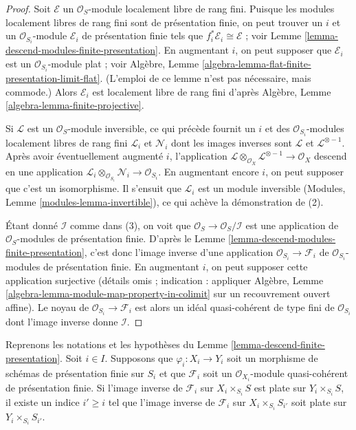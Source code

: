 \begin{proof}
Soit $\mathcal{E}$ un $\mathcal{O}_S$-module localement libre de rang fini. Puisque
les modules localement libres de rang fini sont de présentation finie, on peut trouver un $i$
et un $\mathcal{O}_{S_i}$-module $\mathcal{E}_i$ de présentation finie
tels que $f_i^*\mathcal{E}_i \cong \mathcal{E}$ ; voir
Lemme \ref{lemma-descend-modules-finite-presentation}.
En augmentant $i$, on peut supposer que $\mathcal{E}_i$ est un
$\mathcal{O}_{S_i}$-module plat ; voir
Algèbre, Lemme \ref{algebra-lemma-flat-finite-presentation-limit-flat}.
(L'emploi de ce lemme n'est pas nécessaire, mais commode.)
Alors $\mathcal{E}_i$ est localement libre de rang fini d'après
Algèbre, Lemme \ref{algebra-lemma-finite-projective}.

\medskip\noindent
Si $\mathcal{L}$ est un $\mathcal{O}_S$-module inversible,
ce qui précède fournit un $i$ et des
$\mathcal{O}_{S_i}$-modules localement libres de rang fini $\mathcal{L}_i$
et $\mathcal{N}_i$ dont les images inverses sont $\mathcal{L}$ et
$\mathcal{L}^{\otimes -1}$. Après avoir éventuellement augmenté
$i$, l'application
$\mathcal{L} \otimes_{\mathcal{O}_X} \mathcal{L}^{\otimes -1}
\to \mathcal{O}_X$ descend en une application
$\mathcal{L}_i \otimes_{\mathcal{O}_{S_i}} \mathcal{N}_i \to
\mathcal{O}_{S_i}$. En augmentant encore $i$, on
peut supposer que c'est un isomorphisme. Il s'ensuit que
$\mathcal{L}_i$ est un module inversible
(Modules, Lemme \ref{modules-lemma-invertible}), ce qui
achève la démonstration de (2).

\medskip\noindent
Étant donné $\mathcal{I}$ comme dans (3), on voit que
$\mathcal{O}_S \to \mathcal{O}_S/\mathcal{I}$
est une application de $\mathcal{O}_S$-modules de présentation finie.
D'après le Lemme \ref{lemma-descend-modules-finite-presentation},
c'est donc l'image inverse d'une
application $\mathcal{O}_{S_i} \to \mathcal{F}_i$ de
$\mathcal{O}_{S_i}$-modules de présentation finie. En augmentant $i$,
on peut supposer cette application surjective (détails omis ; indication : appliquer
Algèbre, Lemme \ref{algebra-lemma-module-map-property-in-colimit}
sur un recouvrement ouvert affine). Le noyau de $\mathcal{O}_{S_i} \to \mathcal{F}_i$
est alors un idéal quasi-cohérent de type fini de $\mathcal{O}_{S_i}$
dont l'image inverse donne $\mathcal{I}$.
\end{proof}

\begin{lemma}
\label{lemma-descend-module-flat-finite-presentation}
Reprenons les notations et les hypothèses du
Lemme \ref{lemma-descend-finite-presentation}.
Soit $i \in I$.
Supposons que $\varphi_i : X_i \to Y_i$ soit un morphisme de schémas
de présentation finie sur $S_i$ et que $\mathcal{F}_i$ soit un
$\mathcal{O}_{X_i}$-module quasi-cohérent de présentation finie.
Si l'image inverse de $\mathcal{F}_i$ sur $X_i \times_{S_i} S$ est plate
sur $Y_i \times_{S_i} S$, il existe un indice $i' \geq i$
tel que l'image inverse de $\mathcal{F}_i$ sur $X_i \times_{S_i} S_{i'}$
soit plate sur $Y_i \times_{S_i} S_{i'}$.
\end{lemma}

